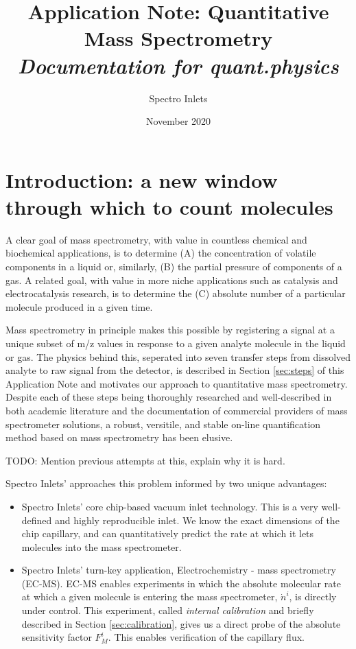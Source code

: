 \documentclass{article}
\title{Application Note: Quantitative Mass Spectrometry \\  \textit{Documentation for \textbf{quant.physics}}}
\author{Spectro Inlets}
\date{November 2020}
\begin{document}
\maketitle

\tableofcontents

\section{Introduction: a new window through which to count molecules}

A clear goal of mass spectrometry, with value in countless chemical and biochemical applications, is to determine (A) the concentration of volatile components in a liquid or, similarly, (B) the partial pressure of components of a gas. A related goal, with value in more niche applications such as catalysis and electrocatalysis research, is to determine the (C) absolute number of a particular molecule produced in a given time. 

Mass spectrometry in principle makes this possible by registering a signal at a unique subset of m/z values in response to a given analyte molecule in the liquid or gas. The physics behind this, seperated into seven transfer steps from dissolved analyte to raw signal from the detector, is described in Section \ref{sec:steps} of this Application Note and motivates our approach to quantitative mass spectrometry. Despite each of these steps being thoroughly researched and well-described in both academic literature and the documentation of commercial providers of mass spectrometer solutions, a robust, versitile, and stable on-line quantification method based on mass spectrometry has been elusive.

{\color{red} TODO: Mention previous attempts at this, explain why it is hard}.

Spectro Inlets' approaches this problem informed by two unique advantages:

\begin{itemize}
	\item 
	Spectro Inlets' core chip-based vacuum inlet technology. This is a very well-defined and highly reproducible inlet. We know the exact dimensions of the chip capillary, and can quantitatively predict the rate at which it lets molecules into the mass spectrometer.
	
	\item 
	Spectro Inlets' turn-key application, Electrochemistry - mass spectrometry (EC-MS). EC-MS enables experiments in which the absolute molecular rate at which a given molecule is entering the mass spectrometer, $\dot{n}^i$, is directly under control. This experiment, called \textit{internal calibration} and briefly described in Section \ref{sec:calibration}, gives us a direct probe of the absolute sensitivity factor $F^i_M$. This enables verification of the capillary flux.
\end{itemize}
\end{document}
